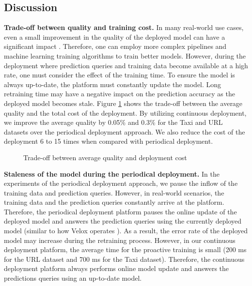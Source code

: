 \subsection{Discussion} \label{subsec:discussion}
\textbf{Trade-off between quality and training cost.}
In many real-world use cases, even a small improvement in the quality of the deployed model can have a significant impact  \cite{ling2017model}.
Therefore, one can employ more complex pipelines and machine learning training algorithms to train better models.
However, during the deployment where prediction queries and training data become available at a high rate, one must consider the effect of the training time.
To ensure the model is always up-to-date, the platform must constantly update the model.
Long retraining time may have a negative impact on the prediction accuracy as the deployed model becomes stale.
Figure \ref{trade-off-figure} shows the trade-off between the average quality and the total cost of the deployment.
By utilizing continuous deployment, we improve the average quality by 0.05\% and 0.3\% for the Taxi and URL datasets over the periodical deployment approach.
We also reduce the cost of the deployment 6 to 15 times when compared with periodical deployment.

\begin{figure}[!h]
\centering
\resizebox{\columnwidth}{!}{}
\caption{Trade-off between average quality and deployment cost}
\label{trade-off-figure}
\end{figure}

\textbf{Staleness of the model during the periodical deployment.}
In the experiments of the periodical deployment approach, we pause the inflow of the training data and prediction queries.
However, in real-world scenarios, the training data and the prediction queries constantly arrive at the platform.
Therefore, the periodical deployment platform pauses the online update of the deployed model and answers the prediction queries using the currently deployed model (similar to how Velox operates \cite{crankshaw2014missing}).
As a result, the error rate of the deployed model may increase during the retraining process.
However, in our continuous deployment platform, the average time for the proactive training is small (200 ms for the URL dataset and 700 ms for the Taxi dataset).
Therefore, the continuous deployment platform always performs online model update and answers the predictions queries using an up-to-date model.